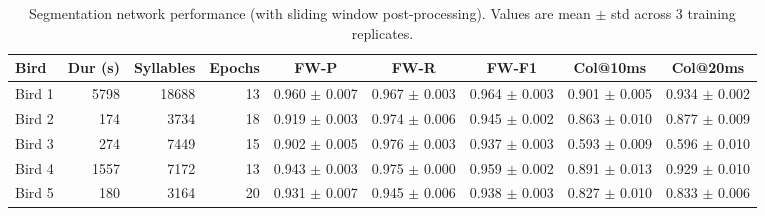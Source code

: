 \begin{table}[ht]
\centering
\caption{Segmentation network performance (with sliding window post-processing). Values are mean $\pm$ std across 3 training replicates.}
\begin{tabular}{l r r r c c c c c}
\toprule
Bird & Dur (s) & Syllables & Epochs & FW-P & FW-R & FW-F1 & Col@10ms & Col@20ms \\
\midrule
Bird 1 & 5798 & 18688 & 13 & 0.960 $\pm$ 0.007 & 0.967 $\pm$ 0.003 & 0.964 $\pm$ 0.003 & 0.901 $\pm$ 0.005 & 0.934 $\pm$ 0.002 \\
Bird 2 & 174 & 3734 & 18 & 0.919 $\pm$ 0.003 & 0.974 $\pm$ 0.006 & 0.945 $\pm$ 0.002 & 0.863 $\pm$ 0.010 & 0.877 $\pm$ 0.009 \\
Bird 3 & 274 & 7449 & 15 & 0.902 $\pm$ 0.005 & 0.976 $\pm$ 0.003 & 0.937 $\pm$ 0.003 & 0.593 $\pm$ 0.009 & 0.596 $\pm$ 0.010 \\
Bird 4 & 1557 & 7172 & 13 & 0.943 $\pm$ 0.003 & 0.975 $\pm$ 0.000 & 0.959 $\pm$ 0.002 & 0.891 $\pm$ 0.013 & 0.929 $\pm$ 0.010 \\
Bird 5 & 180 & 3164 & 20 & 0.931 $\pm$ 0.007 & 0.945 $\pm$ 0.006 & 0.938 $\pm$ 0.003 & 0.827 $\pm$ 0.010 & 0.833 $\pm$ 0.006 \\
\bottomrule
\end{tabular}
\end{table}
